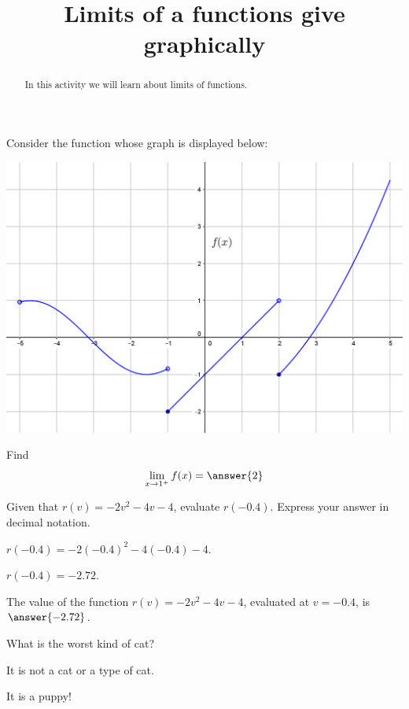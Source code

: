 \documentclass{ximera}
\title{Limits of a functions give graphically}
\begin{document}
\begin{abstract}
In this activity we will learn about limits of functions.
\end{abstract}
\maketitle

Consider the function whose graph is displayed below:
\begin{image}
\includegraphics{pieceWise1.png}
\end{image}

\begin{exercise}
Find 
\[
\lim_{x \to 1^+} f(x)=\answer{2}
\]
\end{exercise}


\begin{exercise}
Given that $r(v)=-2 v^2-4 v-4$, evaluate $r(-0.4)$. Express your answer in decimal notation.
\begin{solution}
\begin{hint}
$r(-0.4)=-2 (-0.4)^2-4 (-0.4)-4$.
\end{hint}
\begin{hint}
$r(-0.4)=-2.72$.
\end{hint}

The value of the function $r(v)=-2 v^2-4 v-4$, evaluated at $v=-0.4$, is $\answer{-2.72}$.
\end{solution}
\end{exercise}



\begin{question}
What is the worst kind of cat?
\begin{prompt}
\begin{multipleChoice}
\end{multipleChoice}
\end{prompt}
\begin{hint}
It is not a cat or a type of cat.
\end{hint}
\begin{hint}
It is a puppy!
\end{hint}
\end{question}
\end{document}

